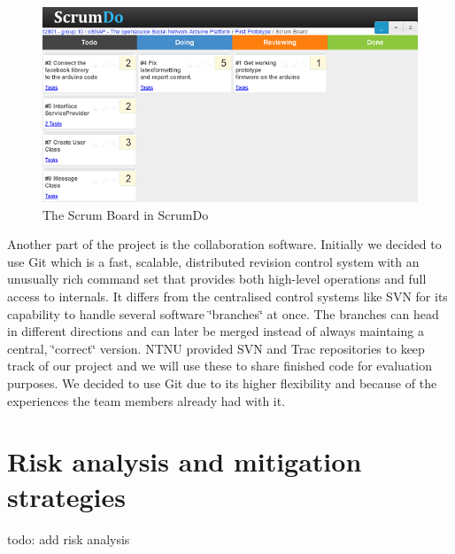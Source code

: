 \begin{figure}[h!]
\centering \includegraphics{img/management-scrumdo} \caption{The Scrum Board in ScrumDo}

\label{fig:management-scrumdo}
\end{figure}
	
Another part of the project is the collaboration software.
Initially we decided to use Git which is a fast, scalable,
distributed revision control system with an unusually rich command
set that provides both high-level operations and full access to internals.
It differs from the centralised control systems like SVN for its capability
to handle several software \char`\"{}branches\char`\"{} at once. The
branches can head in different directions and can later be merged
instead of always maintaing a central, \char`\"{}correct\char`\"{}
version. NTNU provided SVN and Trac repositories to keep track of our
project and we will use these to share finished code for evaluation
purposes. We decided to use Git due to its higher flexibility and because
of the experiences the team members already had with it.

\section{Risk analysis and mitigation strategies}
todo: add risk analysis